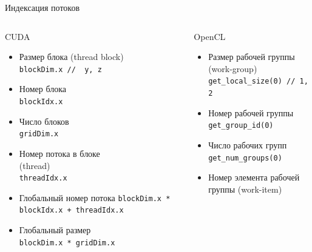 \documentclass[@BEAMER_OPTIONS@]{beamer}
\newcommand{\code}[1]{\lstinline|#1|}
\begin{document}
\begin{frame}[fragile]{Индексация потоков}
    \begin{columns}
        \begin{column}{0.48\textwidth}
            \begin{block}{CUDA}
                \begin{itemize}
                    \item<1-> Размер блока (thread block) \\
                        \code{blockDim.x //  y, z}
                    \item<2-> Номер блока \\
                        \code{blockIdx.x}
                    \item<3-> Число блоков \\
                        \code{gridDim.x}
                    \item<4-> Номер потока в блоке\\ (thread) \\
                        \code{threadIdx.x}
                    \item<5-> Глобальный номер потока
                        \code{blockDim.x * blockIdx.x + threadIdx.x}
                    \item<6-> Глобальный размер \\
                        \code{blockDim.x * gridDim.x}
                \end{itemize}
            \end{block}
        \end{column}
        \begin{column}{0.48\textwidth}
            \begin{block}{OpenCL}
                \begin{itemize}
                    \item<1-> Размер рабочей группы (work-group) \\
                        \code{get_local_size(0) // 1, 2}
                    \item<2-> Номер рабочей группы \\
                        \code{get_group_id(0)}
                    \item<3-> Число рабочих групп \\
                        \code{get_num_groups(0)}
                    \item<4-> Номер элемента рабочей группы (work-item) \\

\end{itemize}
\end{block}
\end{column}
\end{columns}
\end{frame}
\end{document}
